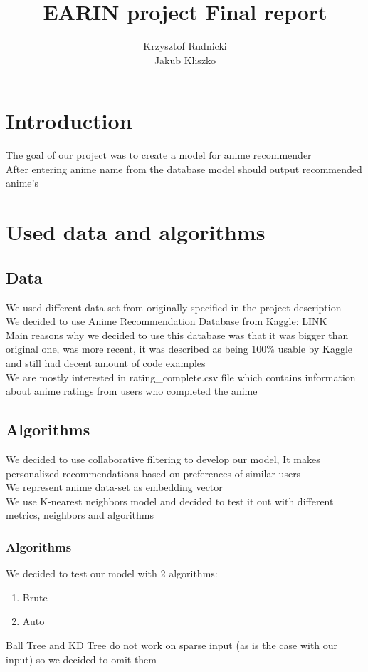 \documentclass[12pt]{article}
\title{EARIN project Final report}
\author{Krzysztof Rudnicki \\ Jakub Kliszko}
\begin{document}
\maketitle
\section{Introduction}
The goal of our project was to create a model for anime recommender \\ 
After entering anime name from the database model should output recommended anime's 
\section{Used data and algorithms}
\subsection{Data}
We used different data-set from originally specified in the project description \\ 
We decided to use Anime Recommendation Database from Kaggle: \href{https://www.kaggle.com/datasets/hernan4444/anime-recommendation-database-2020}{LINK} \\ 
Main reasons why we decided to use this database was that it was bigger than original one, was more recent, it was described as being 100\% usable by Kaggle and still had decent amount of code examples \\ 
We are mostly interested in rating\_complete.csv file which contains information about anime ratings from users who completed the anime 
\subsection{Algorithms}
We decided to use collaborative filtering to develop our model, It makes personalized recommendations based on preferences of similar users \\ 
We represent anime data-set as embedding vector \\ 
We use K-nearest neighbors model and decided to test it out with different metrics, neighbors and algorithms \\ 
\subsubsection{Algorithms}
We decided to test our model with 2  algorithms:
\begin{enumerate}
  \item Brute
  \item Auto
\end{enumerate}
Ball Tree and KD Tree do not work on sparse input (as is the case with our input) so we decided to omit them
\end{document}
